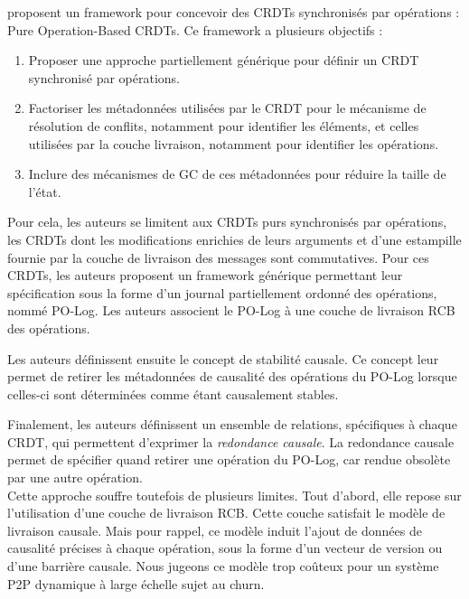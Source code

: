 \textcite{baquero2017pure} proposent un framework pour concevoir des \acp{CRDT} synchronisés par opérations : Pure Operation-Based \acp{CRDT}.
Ce framework a plusieurs objectifs :
\begin{enumerate}
    \item Proposer une approche partiellement générique pour définir un \ac{CRDT} synchronisé par opérations.
    \item Factoriser les métadonnées utilisées par le \ac{CRDT} pour le mécanisme de résolution de conflits, notamment pour identifier les éléments, et celles utilisées par la couche livraison, notamment pour identifier les opérations.
    \item Inclure des mécanismes de \ac{GC} de ces métadonnées pour réduire la taille de l'état.
\end{enumerate}

Pour cela, les auteurs se limitent aux \acp{CRDT} purs synchronisés par opérations, \ie les \acp{CRDT} dont les modifications enrichies de leurs arguments et d'une estampille fournie par la couche de livraison des messages sont commutatives.
Pour ces \acp{CRDT}, les auteurs proposent un framework générique permettant leur spécification sous la forme d'un journal partiellement ordonné des opérations, nommé PO-Log.
Les auteurs associent le PO-Log à une couche de livraison \ac{RCB} des opérations.

Les auteurs définissent ensuite le concept de stabilité causale.
Ce concept leur permet de retirer les métadonnées de causalité des opérations du PO-Log lorsque celles-ci sont déterminées comme étant causalement stables.

Finalement, les auteurs définissent un ensemble de relations, spécifiques à chaque \ac{CRDT}, qui permettent d'exprimer la \emph{redondance causale}.
La redondance causale permet de spécifier quand retirer une opération du PO-Log, car rendue obsolète par une autre opération.\\

Cette approche souffre toutefois de plusieurs limites.
Tout d'abord, elle repose sur l'utilisation d'une couche de livraison \ac{RCB}.
Cette couche satisfait le modèle de livraison causale.
Mais pour rappel, ce modèle induit l'ajout de données de causalité précises à chaque opération, sous la forme d'un vecteur de version ou d'une barrière causale.
Nous jugeons ce modèle trop coûteux pour un système \ac{P2P} dynamique à large échelle sujet au churn.


